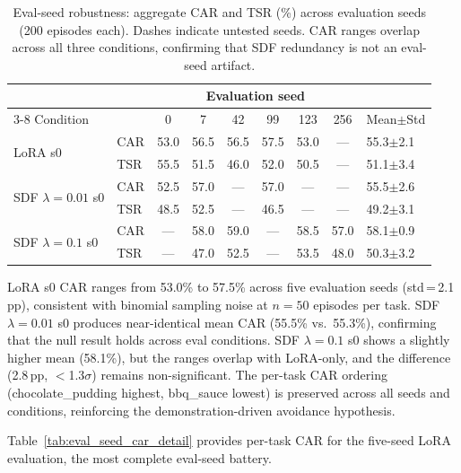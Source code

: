 \begin{table}[h]
\centering
\caption{Eval-seed robustness: aggregate CAR and TSR (\%) across evaluation seeds (200 episodes each). Dashes indicate untested seeds. CAR ranges overlap across all three conditions, confirming that SDF redundancy is not an eval-seed artifact.}
\label{tab:eval_seed_robustness}
\vspace{2pt}
\footnotesize
\begin{tabular}{llccccccl}
\toprule
& & \multicolumn{6}{c}{Evaluation seed} & \\
\cmidrule(lr){3-8}
Condition & & 0 & 7 & 42 & 99 & 123 & 256 & Mean$\pm$Std \\
\midrule
\multirow{2}{*}{LoRA s0}
  & CAR & 53.0 & 56.5 & 56.5 & 57.5 & 53.0 & --- & 55.3$\pm$2.1 \\
  & TSR & 55.5 & 51.5 & 46.0 & 52.0 & 50.5 & --- & 51.1$\pm$3.4 \\
\midrule
\multirow{2}{*}{SDF $\lambda{=}0.01$ s0}
  & CAR & 52.5 & 57.0 & --- & 57.0 & --- & --- & 55.5$\pm$2.6 \\
  & TSR & 48.5 & 52.5 & --- & 46.5 & --- & --- & 49.2$\pm$3.1 \\
\midrule
\multirow{2}{*}{SDF $\lambda{=}0.1$ s0}
  & CAR & --- & 58.0 & 59.0 & --- & 58.5 & 57.0 & 58.1$\pm$0.9 \\
  & TSR & --- & 47.0 & 52.5 & --- & 53.5 & 48.0 & 50.3$\pm$3.2 \\
\bottomrule
\end{tabular}
\end{table}

LoRA s0 CAR ranges from 53.0\% to 57.5\% across five evaluation seeds (std\,=\,2.1\,pp), consistent with binomial sampling noise at $n{=}50$ episodes per task. SDF $\lambda{=}0.01$ s0 produces near-identical mean CAR (55.5\% vs.\ 55.3\%), confirming that the null result holds across eval conditions. SDF $\lambda{=}0.1$ s0 shows a slightly higher mean (58.1\%), but the ranges overlap with LoRA-only, and the difference (2.8\,pp, ${<}$1.3$\sigma$) remains non-significant. The per-task CAR ordering (chocolate\_pudding highest, bbq\_sauce lowest) is preserved across all seeds and conditions, reinforcing the demonstration-driven avoidance hypothesis.

Table~\ref{tab:eval_seed_car_detail} provides per-task CAR for the five-seed LoRA evaluation, the most complete eval-seed battery.

